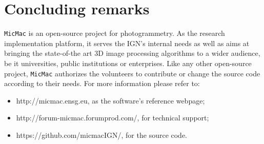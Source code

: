 \documentclass[twocolumn]{bmcart}%
\begin{document}
\section*{Concluding remarks}
%
{\tt MicMac} is an open-source project for photogrammetry. As the research implementation platform, it serves the IGN's internal needs as well as aims at bringing the state-of-the art 3D image processing algorithms to a wider audience, be it universities, public institutions or enterprises. Like any other open-source project, {\tt MicMac} authorizes the volunteers to contribute or change the source code according to their needs. For more information please refer to:
\begin{itemize}
\item http://micmac.ensg.eu, as the  software's reference webpage;
\item http://forum-micmac.forumprod.com/, for technical support;
\item https://github.com/micmacIGN/, for the source code.
\end{itemize}  
 
 

\end{document}
